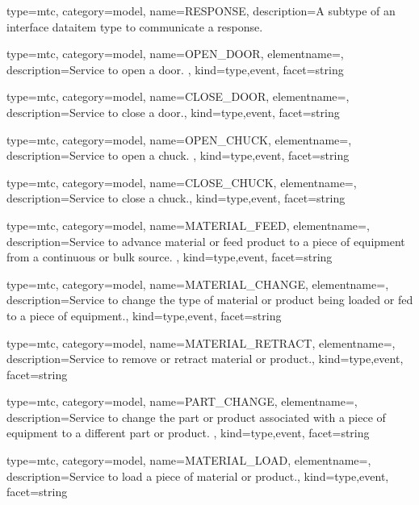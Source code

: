 {
  type=mtc,
  category=model,
  name={RESPONSE},
  description={A subtype of an \gls{interface} \gls{dataitem} type to communicate a response.}
}


{
  type=mtc,
  category=model,
  name={OPEN\_DOOR},
  elementname=,
  description={Service to open a door. },
  kind={type,event},
  facet={\gls{string}}
}


{
  type=mtc,
  category=model,
  name={CLOSE\_DOOR},
  elementname=,
  description={Service to close a door.},
  kind={type,event},
  facet={\gls{string}}
}


{
  type=mtc,
  category=model,
  name={OPEN\_CHUCK},
  elementname=,
  description={Service to open a chuck. },
  kind={type,event},
  facet={\gls{string}}
}


{
  type=mtc,
  category=model,
  name={CLOSE\_CHUCK},
  elementname=,
  description={Service to close a chuck.},
  kind={type,event},
  facet={\gls{string}}
}


{
  type=mtc,
  category=model,
  name={MATERIAL\_FEED},
  elementname=,
  description={Service to advance material or feed product to a piece of equipment from a continuous or bulk source. },
  kind={type,event},
  facet={\gls{string}}
}


{
  type=mtc,
  category=model,
  name={MATERIAL\_CHANGE},
  elementname=,
  description={Service to change the type of material or product being loaded or fed to a piece of equipment.},
  kind={type,event},
  facet={\gls{string}}
}


{
  type=mtc,
  category=model,
  name={MATERIAL\_RETRACT},
  elementname=,
  description={Service to remove or retract material or product.},
  kind={type,event},
  facet={\gls{string}}
}


{
  type=mtc,
  category=model,
  name={PART\_CHANGE},
  elementname=,
  description={Service to change the part or product associated with a piece of equipment to a different part or product.  },
  kind={type,event},
  facet={\gls{string}}
}


{
  type=mtc,
  category=model,
  name={MATERIAL\_LOAD},
  elementname=,
  description={Service to load a piece of material or product.},
  kind={type,event},
  facet={\gls{string}}
}


